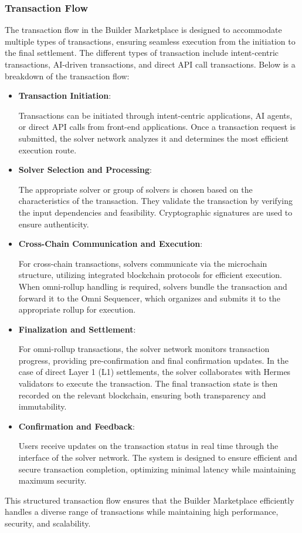 \subsubsection{Transaction Flow}
The transaction flow in the Builder Marketplace is designed to accommodate multiple types of transactions, ensuring seamless execution from the initiation to the final settlement. The different types of transaction include intent-centric transactions, AI-driven transactions, and direct API call transactions. Below is a breakdown of the transaction flow:
\begin{itemize}
    \item \textbf{Transaction Initiation}:

    Transactions can be initiated through intent-centric applications, AI agents, or direct API calls from front-end applications. Once a transaction request is submitted, the solver network analyzes it and determines the most efficient execution route.

    \item \textbf{Solver Selection and Processing}:

    The appropriate solver or group of solvers is chosen based on the characteristics of the transaction. They validate the transaction by verifying the input dependencies and feasibility. Cryptographic signatures are used to ensure authenticity.

    \item \textbf{Cross-Chain Communication and Execution}:

    For cross-chain transactions, solvers communicate via the microchain structure, utilizing integrated blockchain protocols for efficient execution. When omni-rollup handling is required, solvers bundle the transaction and forward it to the Omni Sequencer, which organizes and submits it to the appropriate rollup for execution.

    \item \textbf{Finalization and Settlement}:

    For omni-rollup transactions, the solver network monitors transaction progress, providing pre-confirmation and final confirmation updates. In the case of direct Layer 1 (L1) settlements, the solver collaborates with Hermes validators to execute the transaction. The final transaction state is then recorded on the relevant blockchain, ensuring both transparency and immutability.
    
    \item \textbf{Confirmation and Feedback}:
    
    Users receive updates on the transaction status in real time through the interface of the solver network. The system is designed to ensure efficient and secure transaction completion, optimizing minimal latency while maintaining maximum security.
\end{itemize}

    
This structured transaction flow ensures that the Builder Marketplace efficiently handles a diverse range of transactions while maintaining high performance, security, and scalability.